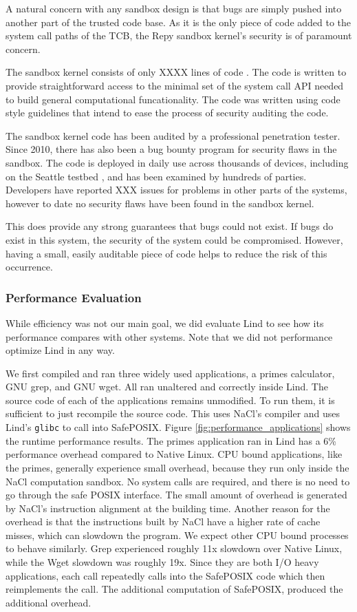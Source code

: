 A natural concern with any sandbox design is that bugs are simply pushed into
another part of the trusted code base.  As it is the only piece of code added
to the system call paths of the TCB, the Repy sandbox kernel's security is of
paramount concern.

The sandbox kernel consists of only XXXX lines of code .
The code is written to provide straightforward access to the minimal set
of the system call API needed to build general computational funcationality.
The code was written using code style guidelines that intend to ease the
process of security auditing the code.

The sandbox kernel code has been 
audited by a professional penetration tester.  Since 2010, there has also been
a bug bounty program for security flaws in the sandbox. 
The code is deployed in daily use across thousands of devices, 
including on the Seattle testbed , and has been examined by 
hundreds of parties.  Developers have reported
XXX issues for problems in other parts of the systems, however to date
no security flaws have been found in the sandbox kernel.

This does provide any strong guarantees that bugs could not exist.  If bugs do
exist in this system, the security of the system could be compromised.  
However, having a small, easily auditable piece of code helps to reduce the
risk of this occurrence.

\subsubsection{Performance Evaluation}
\label{Performance-Evaluation}

While efficiency was not our main goal, we did evaluate Lind to see how
its performance compares with other systems.  Note that we did not performance
optimize Lind in any way.

We first compiled and ran three widely used applications, 
a primes calculator, GNU grep, and GNU wget. All ran unaltered and
correctly inside Lind. The source code of each of the applications remains 
unmodified. To run them, it is sufficient to just recompile the source code.
This uses NaCl's compiler and uses Lind's \texttt{glibc} to call
into SafePOSIX.
Figure \ref{fig:performance_applications} shows the runtime performance
results. 
The primes application ran in Lind has a 6\% performance overhead compared to 
Native Linux. CPU bound applications, like the primes, generally experience small overhead, 
because they run only inside the NaCl computation sandbox. No system calls are required, 
and there is no need to go through the safe POSIX interface. The small amount of overhead 
is generated by NaCl's instruction alignment at the building time. Another reason for the overhead 
is that the instructions built by NaCl have a higher rate of cache misses, which can slowdown the 
program. 
We expect other CPU bound processes to behave similarly. 
Grep experienced roughly 11x slowdown over Native Linux, while the Wget
slowdown was roughly 19x. Since they are both I/O heavy applications, 
each call repeatedly calls into the SafePOSIX code which then reimplements
the call.  The additional computation of SafePOSIX, produced the additional
overhead.  

